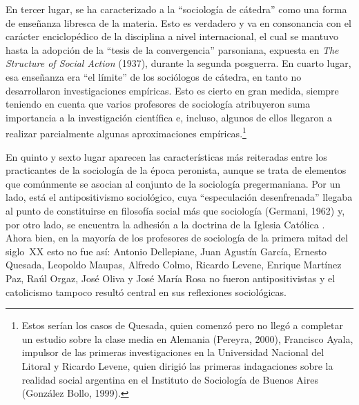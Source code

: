 En tercer lugar, se ha caracterizado a la \enquote{sociología de cátedra} como una forma de enseñanza libresca de la materia. Esto es verdadero y va en consonancia con el carácter enciclopédico de la disciplina a nivel internacional, el cual se mantuvo hasta la adopción de la \enquote{tesis de la convergencia} parsoniana, expuesta en \emph{The Structure of Social Action} (1937), durante la segunda posguerra. En cuarto lugar, esa enseñanza era \enquote{el límite} de los sociólogos de cátedra, en tanto no desarrollaron investigaciones empíricas. Esto es cierto en gran medida, siempre teniendo en cuenta que varios profesores de sociología atribuyeron suma importancia a la investigación científica e, incluso, algunos de ellos llegaron a realizar parcialmente algunas aproximaciones empíricas.\footnote{Estos serían los casos de Quesada, quien comenzó pero no llegó a completar un estudio sobre la clase media en Alemania (Pereyra, 2000), Francisco Ayala, impulsor de las primeras investigaciones en la Universidad Nacional del Litoral \parencite{1619-ESCOBAR2011} y Ricardo Levene, quien dirigió las primeras indagaciones sobre la realidad social argentina en el Instituto de Sociología de Buenos Aires (González Bollo, 1999).}

En quinto y sexto lugar aparecen las características más reiteradas entre los practicantes de la sociología de la época peronista, aunque se trata de elementos que comúnmente se asocian al conjunto de la sociología pregermaniana. Por un lado, está el antipositivismo sociológico, cuya \enquote{especulación desenfrenada} llegaba al punto de constituirse en filosofía social más que sociología (Germani, 1962) y, por otro lado, se encuentra la adhesión a la doctrina de la Iglesia Católica \parencite{1565-BLANCO2006}. Ahora bien, en la mayoría de los profesores de sociología de la primera mitad del siglo~XX esto no fue así: Antonio Dellepiane, Juan Agustín García, Ernesto Quesada, Leopoldo Maupas, Alfredo Colmo, Ricardo Levene, Enrique Martínez Paz, Raúl Orgaz, José Oliva y José María Rosa no fueron antipositivistas y el catolicismo tampoco resultó central en sus reflexiones sociológicas.


